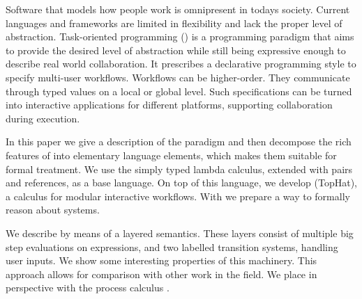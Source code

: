 
Software that models how people work is omnipresent in todays society.
Current languages and frameworks are limited in flexibility and lack the proper level of abstraction.
Task-oriented programming (\TOP) is a programming paradigm that aims to provide the desired level of abstraction while still being expressive enough to describe real world collaboration.
It prescribes a declarative programming style to specify multi-user workflows.
Workflows can be higher-order.
They communicate through typed values on a local or global level.
Such specifications can be turned into interactive applications for different platforms,
supporting collaboration during execution.

In this paper we give a description of the \TOP paradigm and then decompose the rich features of \TOP into elementary language elements,
which makes them suitable for formal treatment.
We use the simply typed lambda calculus, extended with pairs and references, as a base language.
On top of this language, we develop \TOPHAT (TopHat), a calculus for modular interactive workflows.
With \TOPHAT we prepare a way to formally reason about \TOP systems.

We describe \TOPHAT by means of a layered semantics.
These layers consist of multiple big step evaluations on expressions,
and two labelled transition systems, handling user inputs.
We show some interesting properties of this machinery.
This approach allows for comparison with other work in the field.
We place \TOPHAT in perspective with the process calculus \CSP.




